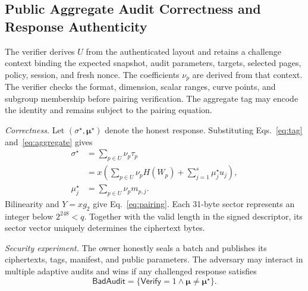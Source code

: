 \documentclass[10pt,journal]{IEEEtran}
\begin{document}
\subsection{Public Aggregate Audit Correctness and Response Authenticity}\label{sec:audit-scope}
The verifier derives $U$ from the authenticated layout and retains a challenge context binding the expected snapshot, audit parameters, targets, selected pages, policy, session, and fresh nonce. The coefficients $\nu_p$ are derived from that context. The verifier checks the format, dimension, scalar ranges, curve points, and subgroup membership before pairing verification. The aggregate tag may encode the identity and remains subject to the pairing equation.

\emph{Correctness.} Let $(\sigma^\star,\boldsymbol\mu^\star)$ denote the honest response. Substituting Eqs.~\eqref{eq:tag} and~\eqref{eq:aggregate} gives
\begin{equation}\label{eq:honest}
\begin{aligned}
\sigma^\star
&=\sum_{p\in U}\nu_p\tau_p\\
&=x\left(\sum_{p\in U}\nu_pH(W_p)+\sum_{j=1}^{s}\mu_j^\star u_j\right),\\
\mu_j^\star&=\sum_{p\in U}\nu_p m_{p,j}.
\end{aligned}
\end{equation}
Bilinearity and $Y=xg_2$ give Eq.~\eqref{eq:pairing}. Each 31-byte sector represents an integer below $2^{248}<q$. Together with the valid length in the signed descriptor, its sector vector uniquely determines the ciphertext bytes.

\emph{Security experiment.} The owner honestly seals a batch and publishes its ciphertexts, tags, manifest, and public parameters. The adversary may interact in multiple adaptive audits and wins if any challenged response satisfies
\begin{equation}\label{eq:bad-audit}
\mathsf{BadAudit}
=\{\mathsf{Verify}=1\land\boldsymbol\mu\ne\boldsymbol\mu^\star\}.
\end{equation}
\end{document}
